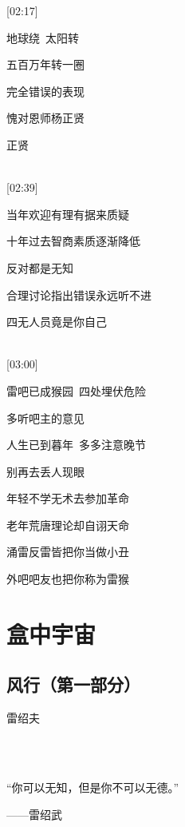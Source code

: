 \documentclass[UTF8,12pt,oneside]{ctexbook}
\begin{document}
\begin{center}
            [02:17]
            
            地球绕\ 太阳转
            
            五百万年转一圈
            
            完全错误的表现
            
            愧对恩师杨正贤
            
            正贤
            
            ~\\
            
            [02:39]
            
            当年欢迎有理有据来质疑
            
            十年过去智商素质逐渐降低
            
            反对都是无知
            
            合理讨论指出错误永远听不进
            
            四无人员竟是你自己
            
            ~\\
            
            [03:00]
            
            雷吧已成猴园\ 四处埋伏危险
            
            多听吧主的意见
            
            人生已到暮年\ 多多注意晚节
            
            别再去丢人现眼
            
            年轻不学无术去参加革命
            
            老年荒唐理论却自诩天命
            
            涌雷反雷皆把你当做小丑
            
            外吧吧友也把你称为雷猴
        \end{center}
    
    \chapter{盒中宇宙}
    \section{风行（第一部分）}
    \begin{center}
    
        雷绍夫
       
        \Large
         ~\\
        
        
        \LARGE
        \heiti
        ~\\
        
        “你可以无知，但是你不可以无德。”
        
        \hfill{——雷绍武}
        
        \songti
    \end{center}
        
\end{document}
